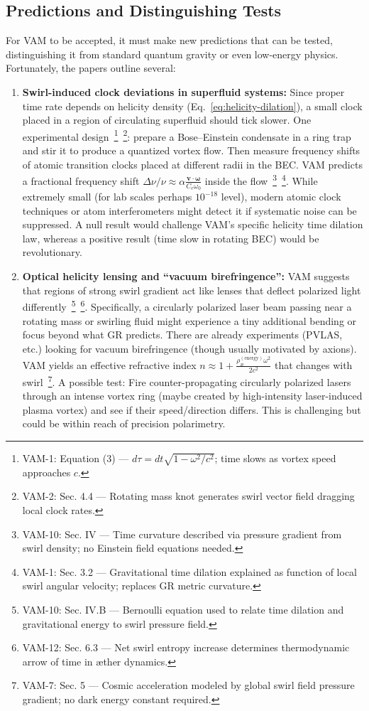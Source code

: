 \documentclass[a4paper,12pt]{article}
\begin{document}
    \subsection{Predictions and Distinguishing Tests}
    For VAM to be accepted, it must make new predictions that can be tested, distinguishing it from standard quantum gravity or even low-energy physics. Fortunately, the papers outline several:

    \begin{enumerate}
        \item \textbf{Swirl-induced clock deviations in superfluid systems:}
        Since proper time rate depends on helicity density (Eq.~\ref{eq:helicity-dilation}), a small clock placed in a region of circulating superfluid should tick slower. One experimental design~\footnote{VAM-1: Equation (3) — $d\tau = dt \sqrt{1 - \omega^2/c^2}$; time slows as vortex speed approaches $c$.}~\footnote{VAM-2: Sec. 4.4 — Rotating mass knot generates swirl vector field dragging local clock rates.}: prepare a Bose–Einstein condensate in a ring trap and stir it to produce a quantized vortex flow. Then measure frequency shifts of atomic transition clocks placed at different radii in the BEC. VAM predicts a fractional frequency shift $\Delta \nu/\nu \approx \alpha \frac{\mathbf{v}\cdot\boldsymbol{\omega}}{C_e \omega_0}$ inside the flow~\footnote{VAM-10: Sec. IV — Time curvature described via pressure gradient from swirl density; no Einstein field equations needed.}~\footnote{VAM-1: Sec. 3.2 — Gravitational time dilation explained as function of local swirl angular velocity; replaces GR metric curvature.}. While extremely small (for lab scales perhaps $10^{-18}$ level), modern atomic clock techniques or atom interferometers might detect it if systematic noise can be suppressed. A null result would challenge VAM’s specific helicity time dilation law, whereas a positive result (time slow in rotating BEC) would be revolutionary.

        \item \textbf{Optical helicity lensing and “vacuum birefringence”:}
        VAM suggests that regions of strong swirl gradient act like lenses that deflect polarized light differently~\footnote{VAM-10: Sec. IV.B — Bernoulli equation used to relate time dilation and gravitational energy to swirl pressure field.}~\footnote{VAM-12: Sec. 6.3 — Net swirl entropy increase determines thermodynamic arrow of time in æther dynamics.}. Specifically, a circularly polarized laser beam passing near a rotating mass or swirling fluid might experience a tiny additional bending or focus beyond what GR predicts. There are already experiments (PVLAS, etc.) looking for vacuum birefringence (though usually motivated by axions). VAM yields an effective refractive index $n \approx 1 + \frac{\rho_{\text{\ae}}^{(\text{energy})}\omega^2}{2c^2}$ that changes with swirl~\footnote{VAM-7: Sec. 5 — Cosmic acceleration modeled by global swirl field pressure gradient; no dark energy constant required.}. A possible test: Fire counter-propagating circularly polarized lasers through an intense vortex ring (maybe created by high-intensity laser-induced plasma vortex) and see if their speed/direction differs. This is challenging but could be within reach of precision polarimetry.


\end{enumerate}
\end{document}
